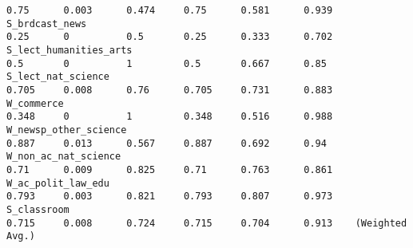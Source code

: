 \begin{verbatim}
0.75      0.003      0.474     0.75      0.581      0.939    S_brdcast_news
0.25      0          0.5       0.25      0.333      0.702    S_lect_humanities_arts
0.5       0          1         0.5       0.667      0.85     S_lect_nat_science
0.705     0.008      0.76      0.705     0.731      0.883    W_commerce
0.348     0          1         0.348     0.516      0.988    W_newsp_other_science
0.887     0.013      0.567     0.887     0.692      0.94     W_non_ac_nat_science
0.71      0.009      0.825     0.71      0.763      0.861    W_ac_polit_law_edu
0.793     0.003      0.821     0.793     0.807      0.973    S_classroom
0.715     0.008      0.724     0.715     0.704      0.913    (Weighted Avg.)
\end{verbatim}
